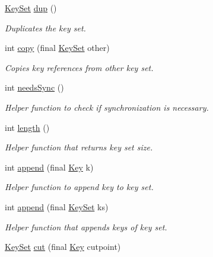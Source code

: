 \begin{DoxyCompactItemize}
\mbox{\hyperlink{classorg_1_1libelektra_1_1KeySet}{Key\+Set}} \mbox{\hyperlink{classorg_1_1libelektra_1_1KeySet_af3571c68cd55983c45666cf9f75143a1}{dup}} ()
\begin{DoxyCompactList}\small\item\em Duplicates the key set. \end{DoxyCompactList}\item 
int \mbox{\hyperlink{classorg_1_1libelektra_1_1KeySet_a32cba0dbe638373296fb242a698ad1cb}{copy}} (final \mbox{\hyperlink{classorg_1_1libelektra_1_1KeySet}{Key\+Set}} other)
\begin{DoxyCompactList}\small\item\em Copies key references from other key set. \end{DoxyCompactList}\item 
int \mbox{\hyperlink{classorg_1_1libelektra_1_1KeySet_a9a21c729da19bc6fb2e7f33fe06ee15e}{needs\+Sync}} ()
\begin{DoxyCompactList}\small\item\em Helper function to check if synchronization is necessary. \end{DoxyCompactList}\item 
int \mbox{\hyperlink{classorg_1_1libelektra_1_1KeySet_aac3920fa38179de07bcd242207915540}{length}} ()
\begin{DoxyCompactList}\small\item\em Helper function that returns key set size. \end{DoxyCompactList}\item 
int \mbox{\hyperlink{classorg_1_1libelektra_1_1KeySet_a5c1738709f8ccda0929204c9151e773e}{append}} (final \mbox{\hyperlink{classorg_1_1libelektra_1_1Key}{Key}} k)
\begin{DoxyCompactList}\small\item\em Helper function to append key to key set. \end{DoxyCompactList}\item 
int \mbox{\hyperlink{classorg_1_1libelektra_1_1KeySet_a383722346ce590f7bc00aae82c1d035d}{append}} (final \mbox{\hyperlink{classorg_1_1libelektra_1_1KeySet}{Key\+Set}} ks)
\begin{DoxyCompactList}\small\item\em Helper function that appends keys of key set. \end{DoxyCompactList}\item 
\mbox{\hyperlink{classorg_1_1libelektra_1_1KeySet}{Key\+Set}} \mbox{\hyperlink{classorg_1_1libelektra_1_1KeySet_a470743c3a6f873427d057c6ce7e3661c}{cut}} (final \mbox{\hyperlink{classorg_1_1libelektra_1_1Key}{Key}} cutpoint)

\end{DoxyCompactItemize}
